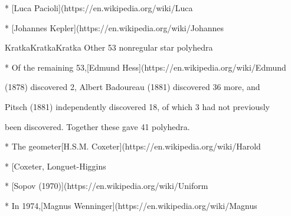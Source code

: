 * [Luca Pacioli](https://en.wikipedia.org/wiki/Luca%

* [Johannes Kepler](https://en.wikipedia.org/wiki/Johannes%

KratkaKratkaKratka Other 53 nonregular star polyhedra

* Of the remaining 53,[Edmund Hess](https://en.wikipedia.org/wiki/Edmund%

(1878) discovered 2, Albert Badoureau (1881) discovered 36 more, and

Pitsch (1881) independently discovered 18, of which 3 had not previously

been discovered. Together these gave 41 polyhedra.

* The geometer[H.S.M. Coxeter](https://en.wikipedia.org/wiki/Harold%

* [Coxeter, Longuet-Higgins %

* [Sopov (1970)](https://en.wikipedia.org/wiki/Uniform%

* In 1974,[Magnus Wenninger](https://en.wikipedia.org/wiki/Magnus%

